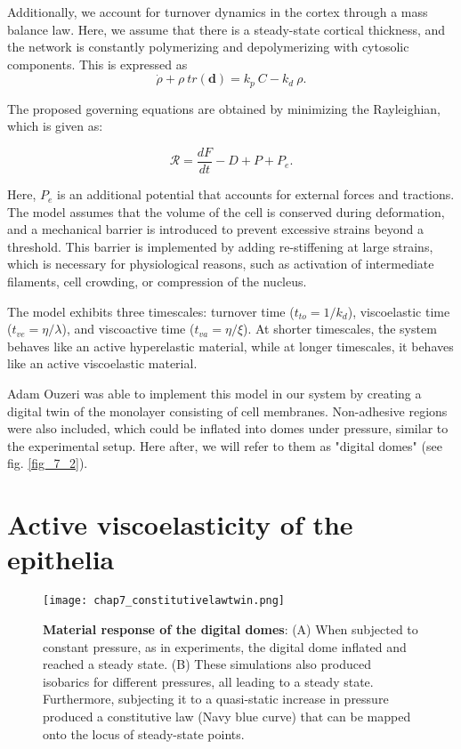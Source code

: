 Additionally, we account for turnover dynamics in the cortex through a mass balance law. Here, we assume that there is a steady-state cortical thickness, and the network is constantly polymerizing and depolymerizing with cytosolic components. This is expressed as $$\dot{\rho} + \rho \ tr(\mathbf{d}) = k_p\ C - k_d\ \rho.$$

The proposed governing equations are obtained by minimizing the Rayleighian, which is given as:

$$ \mathcal{R} = \frac{dF}{dt} - D + P + P_e .$$

Here, $P_e$ is an additional potential that accounts for external forces and tractions. The model assumes that the volume of the cell is conserved during deformation, and a mechanical barrier is introduced to prevent excessive strains beyond a threshold. This barrier is implemented by adding re-stiffening at large strains, which is necessary for physiological reasons, such as activation of intermediate filaments, cell crowding, or compression of the nucleus.

The model exhibits three timescales: turnover time ($t_{to} = 1/k_d$), viscoelastic time ($t_{ve} = \eta/\lambda$), and viscoactive time ($t_{va} = \eta/\xi$). At shorter timescales, the system behaves like an active hyperelastic material, while at longer timescales, it behaves like an active viscoelastic material.

Adam Ouzeri was able to implement this model in our system by creating a digital twin of the monolayer consisting of cell membranes. Non-adhesive regions were also included, which could be inflated into domes under pressure, similar to the experimental setup. Here after, we will refer to them as "digital domes" (see fig. \ref{fig_7_2}).

\hypertarget{active-viscoelasticity-of-the-epithelia}{%
	\section{Active viscoelasticity of the
		epithelia}\label{active-viscoelasticity-of-the-epithelia}}
	
\begin{figure}
	\centering
	\texttt{[image: chap7\_constitutivelawtwin.png]}
	\caption{\label{fig_7_7} \textbf{Material response of the digital domes}: (A)  When subjected to constant pressure, as in experiments, the digital dome inflated and reached a steady state. (B)  These simulations also produced isobarics for different pressures, all leading to a steady state. Furthermore, subjecting it to a quasi-static increase in pressure produced a constitutive law (Navy blue curve) that can be mapped onto the locus of steady-state points.}
\end{figure}


